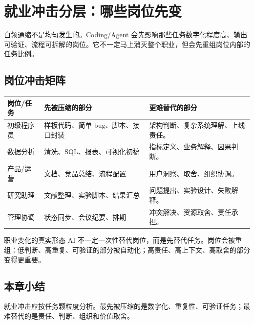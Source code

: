 \section{就业冲击分层：哪些岗位先变}

白领通缩不是均匀发生的。Coding/Agent 会先影响那些任务数字化程度高、输出可验证、流程可拆解的岗位。它不一定马上消灭整个职业，但会先重组岗位内部的任务比例。

\subsection{岗位冲击矩阵}

\noindent\begin{longtable}{p{}p{}p{}}
\toprule
岗位/任务 & 先被压缩的部分 & 更难替代的部分 \\
\midrule
初级程序员 & 样板代码、简单 bug、脚本、接口封装 & 架构判断、复杂系统理解、上线责任。 \\
数据分析 & 清洗、SQL、报表、可视化初稿 & 指标定义、业务解释、因果判断。 \\
产品/运营 & 文档、竞品总结、流程配置 & 用户洞察、取舍、组织协调。 \\
研究助理 & 文献整理、实验脚本、结果汇总 & 问题提出、实验设计、失败解释。 \\
管理协调 & 状态同步、会议纪要、排期 & 冲突解决、资源取舍、责任承担。 \\
\bottomrule
\end{longtable}

\begin{importantbox}{职业变化的真实形态}
AI 不一定一次性替代岗位，而是先替代任务。岗位会被重组：低判断、高重复、可验证的部分被自动化；高责任、高上下文、高取舍的部分变得更重要。
\end{importantbox}

\subsection{本章小结}

就业冲击应按任务颗粒度分析。最先被压缩的是数字化、重复性、可验证任务；最难替代的是责任、判断、组织和价值取舍。

